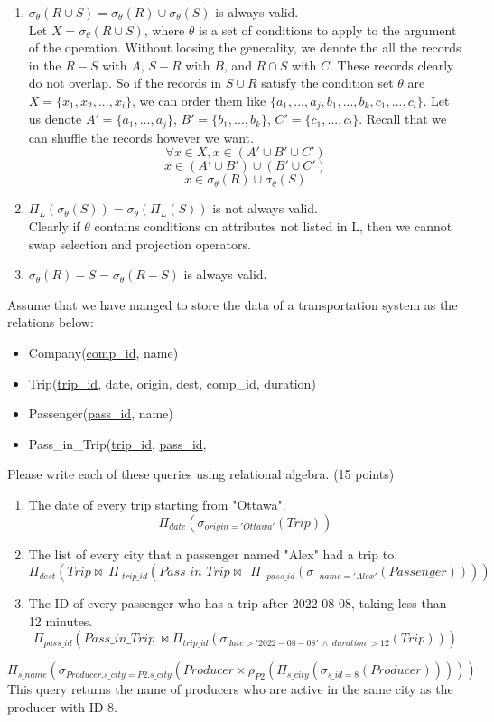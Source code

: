 \documentclass{homework}
\begin{document}
\question 
\begin{enumerate}
    \item $\sigma_\theta (R \cup S) = \sigma_\theta (R) \cup \sigma_\theta (S)$ is always valid. 
    \\Let $X = \sigma_\theta(R\cup S)$, where $\theta$ is a set of conditions to apply to the argument of the operation. Without loosing the generality, we denote the all the records in the $R - S$ with $A$, $S-R$ with $B$, and $R\cap S$ with $C$. These records clearly do not overlap. So if the records in $S\cup R$ satisfy the condition set $\theta$ are $X=\{x_1, x_2, ..., x_i\}$, we can order them like $\{a_1, ..., a_j, b_1, ..., b_k, c_1, ..., c_l\}$. Let us denote $A'=\{a_1, ..., a_j\}$, $B'=\{b_1, ..., b_k\}$, $C'=\{c_1, ..., c_l\}$. Recall that we can shuffle the records however we want.
    \[ \forall x \in X, x\in (A'\cup B' \cup C')\]
    \[x \in (A'\cup B') \cup (B' \cup C')\]
    \[x\in \sigma_\theta(R) \cup \sigma_\theta(S)\]
    \item $\Pi_L (\sigma_\theta (S)) = \sigma_\theta (\Pi_L(S))$ is not always valid. \\Clearly if $\theta$ contains conditions on attributes not listed in L, then we cannot swap selection and projection operators.
    \item $\sigma_\theta(R)-S = \sigma_\theta(R-S)$ is always valid.
\end{enumerate}

\question Assume that we have manged to store the data of a transportation system as the relations below:
\begin{itemize}
    \item Company(\underline{comp\_id}, name)
	\item Trip(\underline{trip\_id}, date, origin, dest, comp\_id, duration)
    \item Passenger(\underline{pass\_id}, name)
    \item Pass\_in\_Trip(\underline{trip\_id}, \underline{pass\_id},
\end{itemize}

Please write each of these queries using relational algebra. (15 points)
\begin{enumerate}
    \item The date of every trip starting from "Ottawa".
    \[\Pi _{date}\left(\sigma _{origin='Ottawa'}\left(Trip\right)\right)\]
    \item The list of every city that a passenger named "Alex" had a trip to.
    \[\Pi _{dest}\left(Trip\bowtie \:\Pi \:_{trip\_id}\left(Pass\_in\_Trip\bowtie \:\:\Pi \:\:_{pass\_id}\left(\sigma \:\:_{name='Alex'}\left(Passenger\right)\right)\right)\right)\]
    \item The ID of every passenger who has a trip after 2022-08-08, taking less than 12 minutes.
    \[\Pi _{pass\_id}\left(Pass\_in\_Trip\:\bowtie \Pi _{trip\_id}\left(\sigma _{date>'2022-08-08'\:\wedge \:duration\:>12}\left(Trip\right)\right)\right)\]
\end{enumerate}

\question \[\Pi_{s\_name}(\sigma_{Producer.s\_city = P2.s\_city}(Producer \times \rho_{P2}(\Pi_{s\_city}(\sigma_{s\_id=8}(Producer)))))\]
This query returns the name of producers who are active in the same city as the producer with ID 8.
\end{document}
